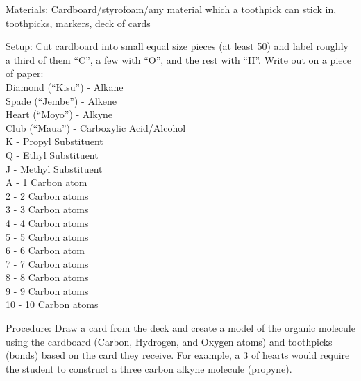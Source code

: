 \begin{multicols}{2}
\begin{description*}
\item[Materials:]{Cardboard/styrofoam/any material which a toothpick can stick in, toothpicks, markers, deck of cards}
\item[Setup:]{Cut cardboard into small equal size pieces (at least 50) and label roughly a third of them ``C'', a few with ``O'', and the rest with ``H''. Write out on a piece of paper:\\

Diamond (``Kisu'') - Alkane\\
Spade (``Jembe'') - Alkene\\
Heart (``Moyo'') - Alkyne\\
Club (``Maua'') - Carboxylic Acid/Alcohol\\

K - Propyl Substituent\\
Q - Ethyl Substituent\\
J - Methyl Substituent \\

A - 1 Carbon atom\\
2 - 2 Carbon atoms\\
3 - 3 Carbon atoms\\
4 - 4 Carbon atoms\\
5 - 5 Carbon atoms\\
6 - 6 Carbon atom\\
7 - 7 Carbon atoms\\
8 - 8 Carbon atoms\\
9 - 9 Carbon atoms\\
10 - 10 Carbon atoms\\}
\item[Procedure:]{Draw a card from the deck and create a model of the organic molecule using the cardboard (Carbon, Hydrogen, and Oxygen atoms) and toothpicks (bonds) based on the card they receive. For example, a 3 of hearts would require the student to construct a three carbon alkyne molecule (propyne). \\

}
\end{description*}
\end{multicols}
